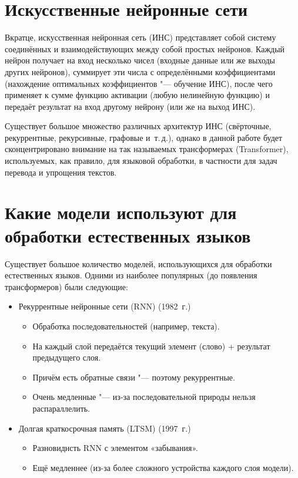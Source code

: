 \section{Искусственные нейронные сети}


Вкратце, искусственная нейронная сеть (ИНС) представляет собой систему соединённых и взаимодействующих между собой простых нейронов. Каждый нейрон получает на вход несколько чисел (входные данные или же выходы других нейронов), суммирует эти числа с определёнными коэффициентами (нахождение оптимальных коэффициентов "--- обучение ИНС), после чего применяет к сумме функцию активации (любую нелинейную функцию) и передаёт результат на вход другому нейрону (или же на выход ИНС).

Существует большое множество различных архитектур ИНС (свёрточные, рекуррентные, рекурсивные, графовые и~т.\,д.), однако в данной работе будет сконцентрировано внимание на так называемых трансформерах (Transformer), используемых, как правило, для языковой обработки, в частности для задач перевода и упрощения текстов.


\section{Какие модели используют для обработки естественных языков}


Существует большое количество моделей, использующихся для обработки естественных языков. Одними из наиболее популярных (до появления трансформеров) были следующие:
\begin{itemize}%
  \item Рекуррентные нейронные сети (RNN) (1982~г.)
    \begin{itemize}%
       \item Обработка последовательностей (например, текста).
       \item На каждый слой передаётся текущий элемент (слово) + результат предыдущего слоя.
       \item Причём есть обратные связи "--- поэтому рекуррентные.
       \item Очень медленные "--- из-за последовательной природы нельзя распараллелить.
     \end{itemize} 
  \item Долгая краткосрочная память (LTSM) (1997~г.)
    \begin{itemize}%
      \item Разновиднсть RNN с элементом «забывания».
      \item Ещё медленнее (из-за более сложного устройства каждого слоя модели).
    \end{itemize}
\end{itemize}

